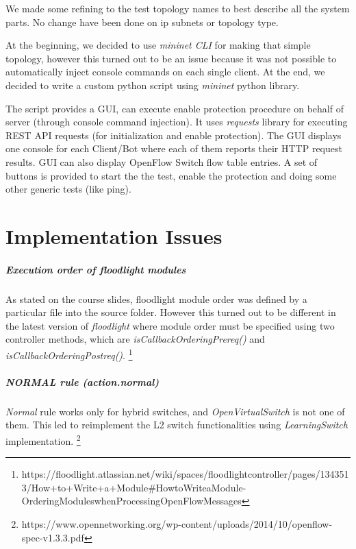 We made some refining to the test topology names to best describe all the system parts. No change have been done on ip subnets or topology type.

At the beginning, we decided to use \textit{mininet CLI} for making that simple topology, however this turned out to be an issue because it was not possible to automatically inject console commands on each single client. At the end, we decided to write a custom python script using \textit{mininet} python library.

The script provides a GUI, can execute enable protection procedure on behalf of server (through console command injection). It uses \textit{requests} library for executing REST API requests (for initialization and enable protection). The GUI displays one console for each Client/Bot where each of them reports their HTTP request results. GUI can also display OpenFlow Switch flow table entries.
A set of buttons is provided to start the the test, enable the protection and doing some other generic tests (like ping).

\chapter{Implementation Issues}
\paragraph{Execution order of floodlight modules}
As stated on the course slides, floodlight module order was defined by a particular file into the source folder. However this turned out to be different in the latest version of \textit{floodlight} where module order must be specified using two controller methods, which are \textit{isCallbackOrderingPrereq()} and \textit{isCallbackOrderingPostreq()}. \footnote{{https://floodlight.atlassian.net/wiki/spaces/floodlightcontroller/pages/1343513/How+to+Write+a+Module\#HowtoWriteaModule-OrderingModuleswhenProcessingOpenFlowMessages}}

\paragraph{NORMAL rule (action.normal)}
\textit{Normal} rule works only for hybrid switches, and \textit{OpenVirtualSwitch} is not one of them. This led to reimplement the L2 switch functionalities using \textit{LearningSwitch} implementation. \footnote{https://www.opennetworking.org/wp-content/uploads/2014/10/openflow-spec-v1.3.3.pdf}

